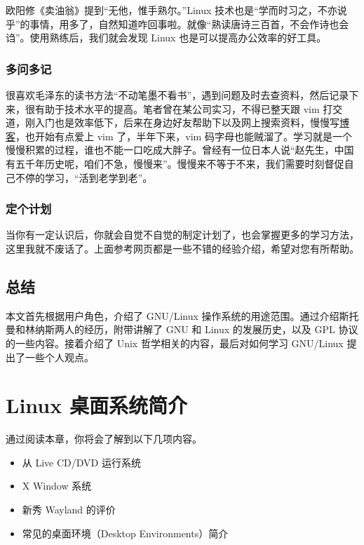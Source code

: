 \documentclass[doctor,openright,twoside]{sjtuthesis}
\providecommand{\tightlist}{%
    \setlength{\itemsep}{0pt}\setlength{\parskip}{0pt}}
\theoremstyle{plain}
\theoremstyle{definition}
\theoremstyle{remark}
\theoremstyle{ocrenumbox}
\theoremstyle{plain}
\newcommand\cqh{“}
\newcommand\cqt{”}
\begin{document}
欧阳修《卖油翁》提到\cqh 无他，惟手熟尔。\cqt  Linux
技术也是\cqh 学而时习之，不亦说乎\cqt 的事情，用多了，自然知道咋回事啦。就像\cqh 熟读唐诗三百首，不会作诗也会诌\cqt 。使用熟练后，我们就会发现
Linux 也是可以提高办公效率的好工具。

\subsection{多问多记}

很喜欢毛泽东的读书方法\cqh 不动笔墨不看书\cqt ，遇到问题及时去查资料，然后记录下来，很有助于技术水平的提高。笔者曾在某公司实习，不得已整天跟
vim
打交道，刚入门也是效率低下，后来在身边好友帮助下以及网上搜索资料，慢慢写\href{https://my.oschina.net/bubifengyun/blog/163516}{博客}，也开始有点爱上
vim 了，半年下来，vim
码字母也能贼溜了。学习就是一个慢慢积累的过程，谁也不能一口吃成大胖子。曾经有一位日本人说\cqh 赵先生，中国有五千年历史呢，咱们不急，慢慢来\cqt 。慢慢来不等于不来，我们需要时刻督促自己不停的学习，\cqh 活到老学到老\cqt 。

\subsection{定个计划}

当你有一定认识后，你就会自觉不自觉的制定计划了，也会掌握更多的学习方法，这里我就不废话了。上面参考网页都是一些不错的经验介绍，希望对您有所帮助。

\section{总结}

本文首先根据用户角色，介绍了 GNU/Linux
操作系统的用途范围。通过介绍斯托曼和林纳斯两人的经历，附带讲解了 GNU 和
Linux 的发展历史，以及 GPL 协议的一些内容。接着介绍了 Unix
哲学相关的内容，最后对如何学习 GNU/Linux 提出了一些个人观点。

\hypertarget{chap:linux-desktop-intro}{%
\chapter{Linux 桌面系统简介}\label{chap:linux-desktop-intro}}

通过阅读本章，你将会了解到以下几项内容。

\begin{itemize}
\tightlist
\item
  从 Live CD/DVD 运行系统
\item
  X Window 系统
\item
  新秀 Wayland 的评价
\item
  常见的桌面环境（Desktop Environments）简介
\end{itemize}
\end{document}
